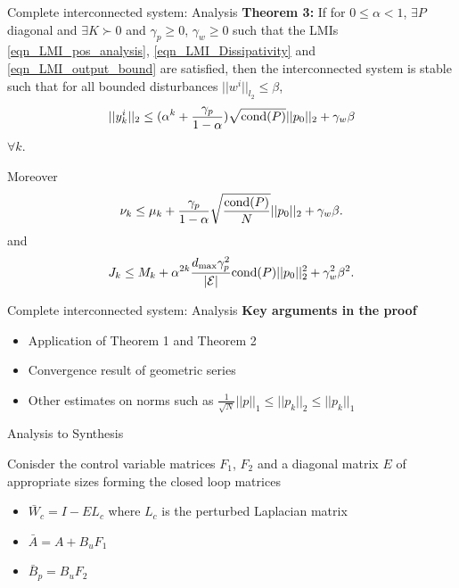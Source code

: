 \begin{frame}{Complete interconnected system: Analysis}
\textbf{Theorem 3:} If for $0\leq \alpha< 1$, $\exists P$ diagonal and $\exists K \succ 0$ and $\gamma_p\geq0$, $\gamma_w\geq0$ such that the LMIs \eqref{eqn_LMI_pos_analysis}, \eqref{eqn_LMI_Dissipativity} and \eqref{eqn_LMI_output_bound} are satisfied,
then the interconnected system is stable such that for all bounded disturbances $||w^i||_{l_2}\leq \beta$,
\begin{equation}\label{eqn:stability guarantee}
||y_k^i||_2\leq (\alpha^k+\frac{\gamma_p}{1-\alpha})\sqrt{\textnormal{cond}(P)}||p_0||_2+\gamma_w\beta
\end{equation} $\forall k$.

Moreover
\begin{equation}\label{perf_bound1}
\begin{split}
\nu_k\leq\mu_k+\frac{\gamma_p}{1-\alpha}\sqrt{\frac{\textnormal{cond}(P)}{N}}||p_0||_2+\gamma_w\beta.
\end{split}
\end{equation}	
and 
\begin{equation}\label{perf_bound2}
J_k\leq M_k+\alpha^{2k}\frac{d_{\textnormal{max}}\gamma_p^2}{|\mathcal{E}|}\textnormal{cond}(P)||p_0||_2^2+\gamma_w^2 \beta^2.
\end{equation}
\end{frame}
\begin{frame}{Complete interconnected system: Analysis}
\textbf{Key arguments in the proof}
\begin{itemize}
\item Application of Theorem 1 and Theorem 2
\item Convergence result of geometric series
\item Other estimates on norms such as $\frac{1}{\sqrt{N}}||p||_1\leq||p_k||_2\leq||p_k||_1$
\end{itemize}
\end{frame}
\begin{frame}{Analysis to Synthesis}

Conisder the control variable matrices $F_1$, $F_2$ and a diagonal matrix $E$ of appropriate sizes forming the closed loop matrices
\begin{itemize}
\item $\bar{W}_c=I-EL_c$ where $L_c$ is the perturbed Laplacian matrix
\item $\bar{A}=A+B_uF_1$
\item $\bar{B}_p=B_uF_2$
\end{itemize}	
\end{frame}
